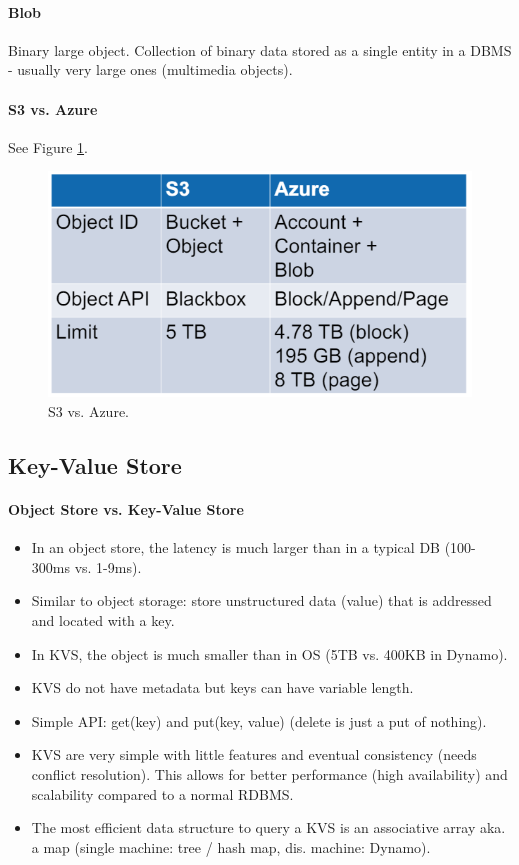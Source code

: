 \paragraph{Blob}
Binary large object. Collection of binary data stored as a single entity in a DBMS - usually very large ones (multimedia objects).

\paragraph{S3 vs. Azure}
See Figure \ref{fig:s3azure}.

\begin{figure}[h]
	\centering
	\includegraphics[scale=0.5]{images/2-s3vsazure.PNG}
	\caption{S3 vs. Azure.}
	\label{fig:s3azure}
\end{figure}



\subsection{Key-Value Store}

\paragraph{Object Store vs. Key-Value Store}
\begin{itemize}
    \item In an object store, the latency is much larger than in a typical DB (100-300ms vs. 1-9ms).
    \item Similar to object storage: store unstructured data (value) that is addressed and located with a key.
    \item In KVS, the object is much smaller than in OS (5TB vs. 400KB in Dynamo).
    \item KVS do not have metadata but keys can have variable length.
    \item Simple API: get(key) and put(key, value) (delete is just a put of nothing).
    \item KVS are very simple with little features and eventual consistency (needs conflict resolution). This allows for better performance (high availability) and scalability compared to a normal RDBMS.
    \item The most efficient data structure to query a KVS is an associative array aka. a map (single machine: tree / hash map, dis. machine: Dynamo).
\end{itemize}

